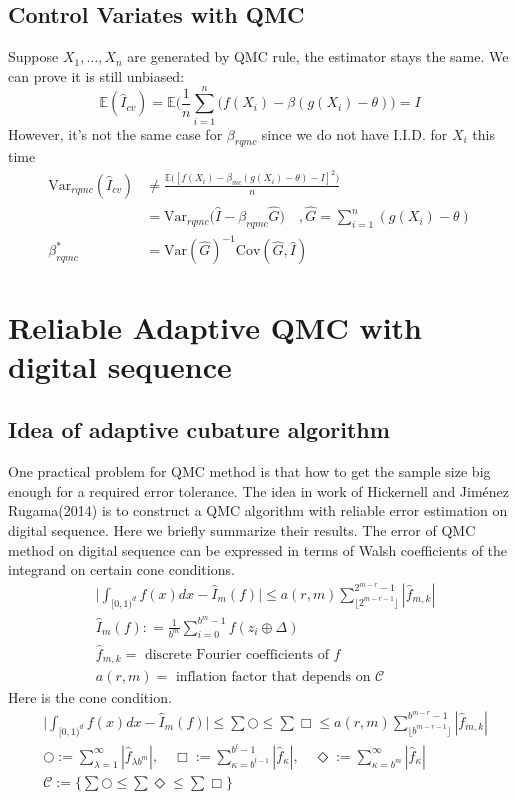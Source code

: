 \subsection{Control Variates with QMC}
Suppose $X_1, \dots, X_n$ are generated by QMC rule, the estimator stays the same.
We can prove it is still unbiased:
\[
\mathbb{E}(\hat{I}_{cv})=\mathbb{E}\Big(\frac{1}{n}\sum_{i=1}^{n}\Big( f(X_i)-\beta(g(X_i)-\theta)\Big)=I 
\]
However, it's not the same case for $\beta_{rqmc}$ since we do not have I.I.D. for $X_i$ this time
\begin{align*}
\mathrm{Var}_{rqmc}(\hat{I}_{cv}) &\not= \frac{\mathbb{E}\big([f(X_i)-\beta_{mc}(g(X_i)-\theta)-I]^2 \big)}{n}\\
&=\mathrm{Var}_{rqmc}\Big( \hat{I}- \beta_{rqmc}\hat{G}\Big)\quad , \hat{G}=\sum_{i=1}^{n}(g(X_i)-\theta)\\
\beta_{rqmc}^*&= \mathrm{Var} (\hat{G})^{-1}\mathrm{Cov} (\hat{G}, \hat{I})
\end{align*}

\section{Reliable Adaptive QMC with digital sequence}
\subsection{Idea of adaptive cubature algorithm}
One practical problem for QMC method is that how to get the sample size big enough for a required error tolerance. 
The idea in work of Hickernell and Jiménez Rugama(2014) is to construct a 
QMC algorithm with reliable error estimation on digital sequence. 
Here we briefly summarize their results.
The error of QMC method on digital sequence can be expressed in terms of Walsh coefficients of the integrand on certain cone conditions. 
\begin{align*}
&\Big|\int_{[0,1)^d}f(x)dx - \hat{I}_m(f)\Big| \leq a(r,m) \sum_{\lfloor 2^{m-r-1} \rfloor}^{2^{m-r}-1} |\hat{f}_{m,k}|\\
&\hat{I}_m(f): = \frac{1}{b^m}\sum_{i=0}^{b^m-1}f(z_i\oplus \Delta)\\
&\hat{f}_{m,k}=\text{ discrete Fourier coefficients of }f\\
&a(r,m) =\text{ inflation factor that depends on } \mathcal{C}
\end{align*}
Here is the cone condition.
\begin{align*}
	&\Big|\int_{[0,1)^d}f(x)dx - \hat{I}_m(f)\Big|
    \leq \sum {\bigcirc} 
	\leq \sum {\Box}
	\leq a(r,m) \sum_{\lfloor b^{m-r-1} \rfloor}^{b^{m-r}-1}|\hat{f}_{m,k}|\\
    &\bigcirc:= \sum_{\lambda=1}^{\infty}| \hat{f}_{\lambda b^m}|,\quad  
    \Box:= \sum_{\kappa=b^{l-1}}^{b^l-1}|\hat{f}_\kappa|,\quad
    \Diamond:=\sum_{\kappa=b^m}^{\infty}|\hat{f}_{\kappa}|\\
    &\mathcal{C}:=\Big\{\sum{\bigcirc} \leq \sum{\Diamond} \leq \sum{\Box}\Big\}
\end{align*}


